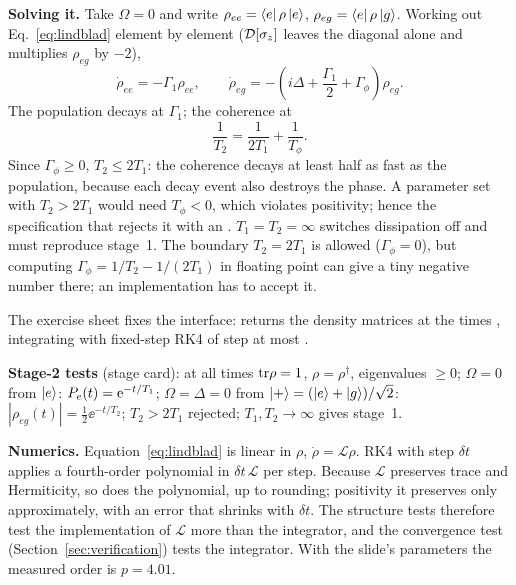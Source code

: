 \textbf{Solving it.} Take $\Omega = 0$ and write $\rho_{ee} = \bra{e}\rho\ket{e}$,
$\rho_{eg} = \bra{e}\rho\ket{g}$. Working out Eq.~\eqref{eq:lindblad} element by element
($\mathcal{D}[\sigma_z]$ leaves the diagonal alone and multiplies $\rho_{eg}$ by $-2$),
\begin{equation}
  \dot\rho_{ee} = -\Gamma_1 \rho_{ee},
  \qquad
  \dot\rho_{eg} = -\left(i\Delta + \frac{\Gamma_1}{2} + \Gamma_\phi\right)\rho_{eg}.
\end{equation}
The population decays at $\Gamma_1$; the coherence at
\begin{equation}\label{eq:T2}
  \frac{1}{T_2} = \frac{1}{2T_1} + \frac{1}{T_\phi}.
\end{equation}
Since $\Gamma_\phi \geq 0$, $T_2 \leq 2T_1$: the coherence decays at least half as fast
as the population, because each decay event also destroys the phase. A parameter set with
$T_2 > 2T_1$ would need $T_\phi < 0$, which violates positivity; hence the specification
that  rejects it with an . $T_1 = T_2 = \infty$ switches
dissipation off and must reproduce stage~1. The boundary $T_2 = 2T_1$ is allowed
($\Gamma_\phi = 0$), but computing $\Gamma_\phi = 1/T_2 - 1/(2T_1)$ in floating point can
give a tiny negative number there; an implementation has to accept it.

The exercise sheet  fixes the interface:
 returns the density matrices at the times ,
integrating with fixed-step RK4 of step at most .

\textbf{Stage-2 tests} (stage card): at all times $\mathrm{tr}\rho = 1$, $\rho = \rho^\dagger$,
eigenvalues $\geq 0$; $\Omega = 0$ from $\ket{e}$: $P_e(t) = \mathrm{e}^{-t/T_1}$; $\Omega =
\Delta = 0$ from $\ket{+} = (\ket{e} + \ket{g})/\sqrt2$: $|\rho_{eg}(t)| =
\frac12\ee^{-t/T_2}$; $T_2 > 2T_1$ rejected; $T_1, T_2 \to \infty$ gives stage~1.

\textbf{Numerics.} Equation~\eqref{eq:lindblad} is linear in $\rho$,
$\dot\rho = \mathcal{L}\rho$. RK4 with step $\delta t$ applies a fourth-order polynomial in
$\delta t\,\mathcal{L}$ per step. Because $\mathcal{L}$ preserves trace and Hermiticity, so
does the polynomial, up to rounding; positivity it preserves only approximately, with an
error that shrinks with $\delta t$. The structure tests therefore test the
implementation of $\mathcal{L}$ more than the integrator, and the convergence test
(Section~\ref{sec:verification}) tests the integrator. With the slide's parameters the
measured order is $p = 4.01$.

